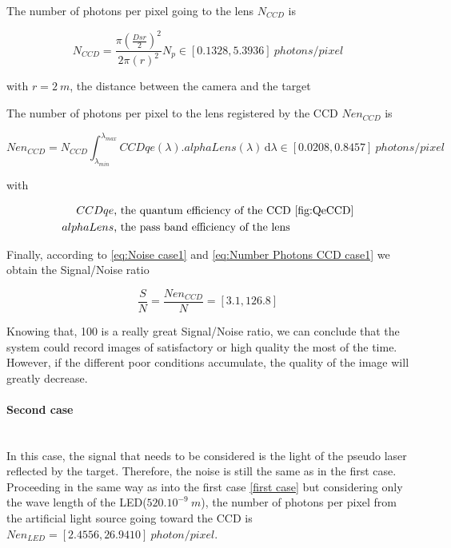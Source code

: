 The number of photons per pixel going to the lens $N_{CCD}$ is

\begin{equation}
\label{eq:Number Photons case1}
N_{CCD}=\frac{\pi\left(\frac{Dsr}{2}\right)^2}{2\pi(r)^2}N_p \in [0.1328, 5.3936] \ photons/pixel
\end{equation}

with $r = 2\ m$, the distance between the camera and the target

The number of photons per pixel to the lens registered by the CCD $Nen_{CCD}$ is

\begin{equation}
\label{eq:Number Photons CCD case1}
Nen_{CCD}= N_{CCD}\int_{\lambda_{min}}^{\lambda_{max}}CCDqe(\lambda).alphaLens(\lambda) \, \mathrm d\lambda \in [0.0208, 0.8457] \ photons/pixel
\end{equation}

with

\begin{align*}
CCDqe & \mbox{, the quantum efficiency of the CCD \ref{fig:QeCCD}}\\
alphaLens & \mbox{, the pass band efficiency of the lens}
\end{align*}

Finally, according to \eqref{eq:Noise case1} and \eqref{eq:Number Photons CCD case1} we obtain the Signal/Noise ratio 

\begin{equation}
\label{eq:Signal Noise Ratio case1}
\frac{S}{N} = \frac{Nen_{CCD}}{N} = [3.1, 126.8]
\end{equation}

Knowing that, 100 is a really great Signal/Noise ratio, we can conclude that the system could record images of satisfactory or high quality the most of the time. However, if the different poor conditions accumulate, the quality of the image will greatly decrease.

\paragraph*{Second case}
~~\\
In this case, the signal that needs to be considered is the light of the pseudo laser reflected by the target. Therefore, the noise is still the same as in the first case.
Proceeding in the same way as into the first case \ref{first case} but considering only the wave length of the LED($520.10^{-9}\ m$), the number of photons per pixel from the artificial light source going toward the CCD is $Nen_{LED} = [2.4556, 26.9410]\ photon/pixel$.

